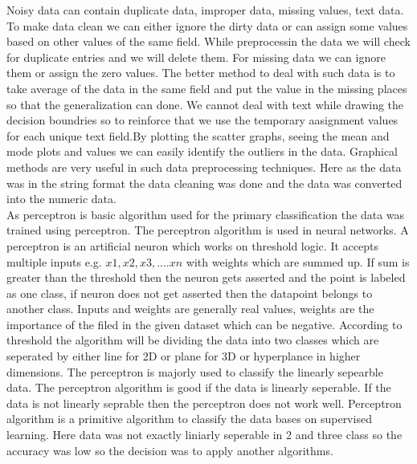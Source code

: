 \documentclass[conference,compsoc]{IEEEtran}
\begin{document}
Noisy data can contain duplicate data,
improper data, missing values, text data. To
make data clean we can either ignore the dirty
data or can assign some values based on other
values of the same field. While preprocessin the
data we will check for duplicate entries and we
will delete them. For missing data we can ignore
them or assign the zero values. The better
method to deal with such data is to take average
of the data in the same field and put the value in
the missing places so that the generalization can
done. We cannot deal with text while drawing
the decision boundries so to reinforce that we
use the temporary aasignment values for each
unique text field.By plotting the scatter graphs, seeing the
mean and mode plots and values we can easily
identify the outliers in the data. Graphical
methods are very useful in such data
preprocessing techniques. Here as the data was in the string format the data cleaning was done
and the data was converted into the numeric data.\\

As perceptron is basic algorithm used for the primary classification the data
was trained using perceptron. The perceptron algorithm is used in
neural networks. A perceptron is an artificial
neuron which works on threshold logic. It
accepts multiple inputs e.g. ${x1,x2,x3,....xn}$ with
weights which are summed up. If sum is greater
than the threshold then the neuron gets asserted
and the point is labeled as one class, if neuron
does not get asserted then the datapoint belongs
to another class. Inputs and weights are
generally real values, weights are the
importance of the filed in the given dataset
which can be negative.
According to threshold the algorithm
will be dividing the data into two classes which
are seperated by either line for 2D or plane for
3D or hyperplance in higher dimensions. The
perceptron is majorly used to classify the
linearly sepearble data. The perceptron algorithm is good if the data is linearly seperable. If the data is not linearly seprable then the perceptron does not work well. Perceptron algorithm is a primitive algorithm to classify the data bases on supervised learning. Here data was not exactly liniarly seperable in 2 and three class so the accuracy was low so the decision was to apply another algorithms.\\
\end{document}

